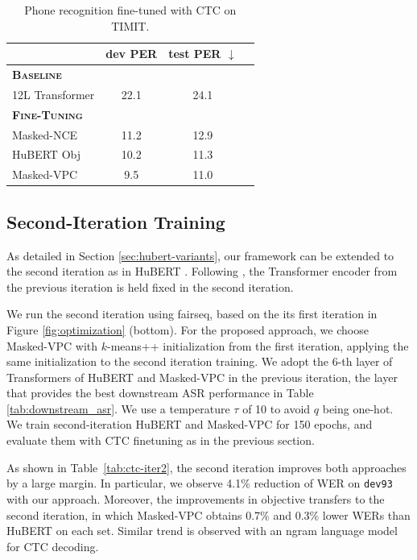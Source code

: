\documentclass[11pt,a4paper]{article}
\begin{document}
\begin{table}[t]
  \centering
  \caption{Phone recognition fine-tuned with CTC on TIMIT.}
  \label{tab:ctc2}
  \footnotesize
  \begin{tabular}{lccc}
    \toprule
                             &dev PER     &test PER $\downarrow$ \\
    \midrule
    \textbf{\textsc{Baseline}} &\\[1pt]
    12L Transformer &22.1 &24.1\\
    \midrule
    \multicolumn{2}{l}{\textbf{\textsc{Fine-Tuning}}} \\[1pt]
    Masked-NCE      &11.2  &12.9 \\
    HuBERT Obj      &10.2  &11.3 \\
    Masked-VPC      &9.5   &11.0 \\
    \bottomrule
  \end{tabular}
\end{table}

\subsection{Second-Iteration Training}

As detailed in Section \ref{sec:hubert-variants},
our framework can be extended to the second iteration
as in HuBERT \citep{hsu2021hubert}.
%
%
%
%
%
%
%
%
%
%
%
%
%
Following \citet{hsu2021hubert}, the Transformer encoder
from the previous iteration is held fixed in the second iteration.

We run the second iteration using fairseq, based on the its first iteration in Figure \ref{fig:optimization} (bottom). 
For the proposed approach, we choose Masked-VPC with $k$-means++ initialization from the first iteration, 
applying the same initialization to the second iteration training.
We adopt the 6-th layer of Transformers of HuBERT and Masked-VPC in the previous iteration, the layer that provides the best downstream ASR performance in Table \ref{tab:downstream_asr}.
We use a temperature $\tau$ of 10 to avoid $q$ being one-hot.
We train second-iteration HuBERT and Masked-VPC for 150 epochs, and evaluate them with CTC finetuning 
as in the previous section.

As shown in Table~\ref{tab:ctc-iter2}, the second iteration improves both approaches by a large margin.
In particular, we observe 4.1\% reduction of WER on \texttt{dev93} with our approach. 
Moreover, the improvements in objective transfers to the second iteration, in which 
Masked-VPC obtains 0.7\% and 0.3\% lower WERs than HuBERT on each set.
Similar trend is observed with an ngram language model for CTC decoding.
\end{document}
